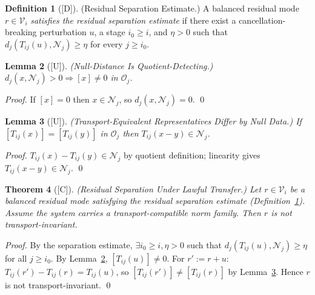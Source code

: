 \documentclass[12pt,oneside]{amsbook}
\theoremstyle{plain}
\newtheorem{theorem}{Theorem}[section]
\newtheorem{lemma}[theorem]{Lemma}
\theoremstyle{definition}
\newtheorem{definition}[theorem]{Definition}
\theoremstyle{remark}
\newcommand{\status}[1]{\textup{[#1]}}
\begin{document}
\begin{definition}[\status{D}]\label{def:residual-sep-estimate}
\textup{(Residual Separation Estimate.)}
A balanced residual mode $r \in \mathcal{V}_i$ \emph{satisfies the
residual separation estimate} if there exist a cancellation-breaking
perturbation $u$, a stage $i_0 \geq i$, and $\eta>0$ such that
$d_j(T_{ij}(u),\mathcal{N}_j) \geq \eta$ for every $j \geq i_0$.
\end{definition}

\begin{lemma}[\status{U}]\label{lem:null-distance-quotient}
\textup{(Null-Distance Is Quotient-Detecting.)}
$d_j(x,\mathcal{N}_j) > 0 \Rightarrow [x] \neq 0$ in $\mathcal{O}_j$.
\end{lemma}

\begin{proof}
If $[x]=0$ then $x \in \mathcal{N}_j$, so $d_j(x,\mathcal{N}_j)=0$. \qed
\end{proof}

\begin{lemma}[\status{U}]\label{lem:transport-equiv-null}
\textup{(Transport-Equivalent Representatives Differ by Null Data.)}
If $[T_{ij}(x)]=[T_{ij}(y)]$ in $\mathcal{O}_j$ then
$T_{ij}(x-y) \in \mathcal{N}_j$.
\end{lemma}

\begin{proof}
$T_{ij}(x)-T_{ij}(y) \in \mathcal{N}_j$ by quotient definition;
linearity gives $T_{ij}(x-y) \in \mathcal{N}_j$. \qed
\end{proof}

\begin{theorem}[\status{C}]\label{thm:residual-separation-under-transfer}
\textup{(Residual Separation Under Lawful Transfer.)}
Let $r \in \mathcal{V}_i$ be a balanced residual mode satisfying the
residual separation estimate
(Definition~\ref{def:residual-sep-estimate}).  Assume the system
carries a transport-compatible norm family.  Then $r$ is not
transport-invariant.
\end{theorem}

\begin{proof}
By the separation estimate, $\exists i_0 \geq i, \eta>0$ such that
$d_j(T_{ij}(u),\mathcal{N}_j) \geq \eta$ for all $j \geq i_0$.
By Lemma~\ref{lem:null-distance-quotient}, $[T_{ij}(u)] \neq 0$.
For $r' := r+u$: $T_{ij}(r') - T_{ij}(r) = T_{ij}(u)$, so
$[T_{ij}(r')] \neq [T_{ij}(r)]$ by Lemma~\ref{lem:transport-equiv-null}.
Hence $r$ is not transport-invariant. \qed
\end{proof}
\end{document}
